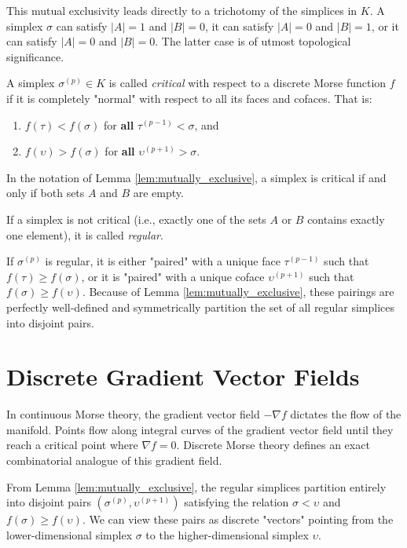 This mutual exclusivity leads directly to a trichotomy of the simplices in $K$. A simplex $\sigma$ can satisfy $|A|=1$ and $|B|=0$, it can satisfy $|A|=0$ and $|B|=1$, or it can satisfy $|A|=0$ and $|B|=0$. The latter case is of utmost topological significance.

\begin{definition}
A simplex $\sigma^{(p)} \in K$ is called \emph{critical} with respect to a discrete Morse function $f$ if it is completely "normal" with respect to all its faces and cofaces. That is:
\begin{enumerate}
    \item $f(\tau) < f(\sigma)$ for \textbf{all} $\tau^{(p-1)} < \sigma$, and
    \item $f(\upsilon) > f(\sigma)$ for \textbf{all} $\upsilon^{(p+1)} > \sigma$.
\end{enumerate}
In the notation of Lemma \ref{lem:mutually_exclusive}, a simplex is critical if and only if both sets $A$ and $B$ are empty.

If a simplex is not critical (i.e., exactly one of the sets $A$ or $B$ contains exactly one element), it is called \emph{regular}. 
\end{definition}

If $\sigma^{(p)}$ is regular, it is either "paired" with a unique face $\tau^{(p-1)}$ such that $f(\tau) \ge f(\sigma)$, or it is "paired" with a unique coface $\upsilon^{(p+1)}$ such that $f(\sigma) \ge f(\upsilon)$. Because of Lemma \ref{lem:mutually_exclusive}, these pairings are perfectly well-defined and symmetrically partition the set of all regular simplices into disjoint pairs.

\section{Discrete Gradient Vector Fields}

In continuous Morse theory, the gradient vector field $-\nabla f$ dictates the flow of the manifold. Points flow along integral curves of the gradient vector field until they reach a critical point where $\nabla f = 0$. Discrete Morse theory defines an exact combinatorial analogue of this gradient field.

From Lemma \ref{lem:mutually_exclusive}, the regular simplices partition entirely into disjoint pairs $(\sigma^{(p)}, \upsilon^{(p+1)})$ satisfying the relation $\sigma < \upsilon$ and $f(\sigma) \ge f(\upsilon)$. We can view these pairs as discrete "vectors" pointing from the lower-dimensional simplex $\sigma$ to the higher-dimensional simplex $\upsilon$.

